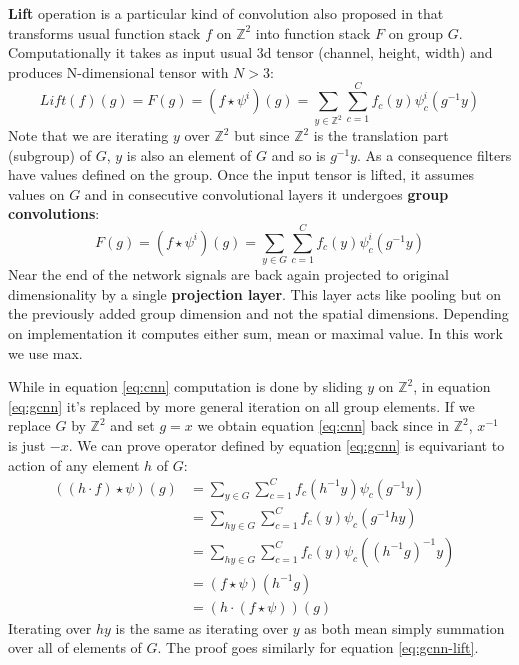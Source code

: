     \textbf{Lift} operation is a particular kind of convolution also proposed in
    \cite{cohen2016}
    that transforms usual function stack $f$ on $\mathbb{Z}^2$ into
    function stack $F$ on group $G$. Computationally it takes as input
    usual 3d tensor (channel, height, width) and produces
    N-dimensional tensor with $N>3$:
    \begin{equation}
        \label{eq:gcnn-lift}
        \mathit{Lift}(f)(g) = F(g) = (f\star\psi^i)(g) = \sum_{y\in \mathbb{Z}^2}\sum_{c=1}^C
        f_c(y)\psi_{c}^{i}(g^{-1}y)
    \end{equation}
    Note that we are iterating $y$ over $\mathbb{Z}^2$ but
    since $\mathbb{Z}^2$ is the translation part (subgroup) of $G$,
    $y$ is also an element of $G$ and so is
    $g^{-1}y$. As a consequence filters have values defined on
    the group.
    Once the input tensor is lifted, it assumes values on $G$
    and in consecutive convolutional layers it
    undergoes \textbf{group convolutions}:
    \begin{equation}
        \label{eq:gcnn}
        F(g) = (f\star\psi^i)(g) = \sum_{y\in G}\sum_{c=1}^C
        f_c(y)\psi_{c}^{i}(g^{-1}y)
    \end{equation}
    Near the end of the network signals are back again projected to original
    dimensionality by a single \textbf{projection layer}. This layer acts like
    pooling but on the previously added group dimension and not the spatial
    dimensions. Depending on implementation it computes either sum, mean or
    maximal value. In this work we use max.

    While in equation \ref{eq:cnn} computation is done by sliding
    $y$ on $\mathbb{Z}^2$, in equation \ref{eq:gcnn} it's replaced by more
    general iteration on all group elements. If we replace $G$ by $\mathbb{Z}^2$
    and set $g=x$ we obtain equation \ref{eq:cnn} back since in $\mathbb{Z}^2$,
    $x^{-1}$ is just $-x$. We can prove operator defined by equation
    \ref{eq:gcnn} is equivariant to action of any element $h$ of $G$:
    \begin{align*}
        ((h\cdot f)\star\psi)(g) & =
        \sum_{y\in G}\sum_{c=1}^C f_c(h^{-1}y)\psi_{c}(g^{-1}y)\\
        & = \sum_{hy\in G}\sum_{c=1}^C f_c(y)\psi_{c}(g^{-1}hy)\\
        & = \sum_{hy\in G}\sum_{c=1}^C f_c(y)\psi_{c}((h^{-1}g)^{-1}y)\\
        & = (f\star\psi)(h^{-1}g) &  \\
        & = (h\cdot(f\star\psi))(g)
    \end{align*}
    Iterating over $hy$ is the same as iterating over $y$ as both mean simply
    summation over all of elements of $G$.
    The proof goes similarly for equation \ref{eq:gcnn-lift}.


